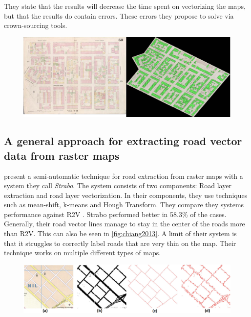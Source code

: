 They state that the results will decrease the time spent on vectorizing the maps, but that the results do contain errors. These errors they propose to solve via crown-sourcing tools.


\begin{figure}[H]
	\centering
	\includegraphics[width=\linewidth]{fig/nyplmap.png}
	\label{fig:nyplmap}
\end{figure}

\subsection{A general approach for extracting road vector data from raster maps}

\citet{Chiang2013} present a semi-automatic technique for road extraction from raster maps with a system they call \emph{Strabo}. The system consists of two components: Road layer extraction and road layer vectorization. In their components, they use techniques such as mean-shift, k-means and Hough Transform. They compare they systems performance against R2V \cite{Wu1999}. Strabo performed better in 58.3\% of the cases. Generally, their road vector lines manage to stay in the center of the roads more than R2V. This can also be seen in \autoref{fig:chiang2013}. A limit of their system is that it struggles to correctly label roads that are very thin on the map. Their technique works on multiple different types of maps. 

\begin{figure}[H]
	\centering
	\includegraphics[width=0.9\linewidth]{fig/chiang2013.png}
	\label{fig:chiang2013}
\end{figure}

